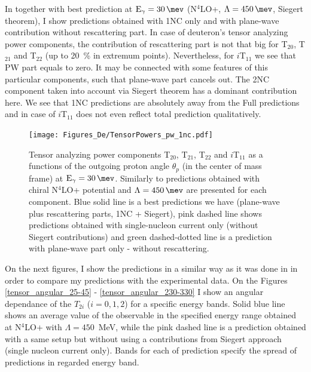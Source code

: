     In  together with best prediction at $\text{E}_\gamma = \SI{30}{\mev}$ (N$^4$LO+, $\Lambda=\SI{450}{\mev}$, Siegert theorem),
    I show predictions obtained with 1NC only and with plane-wave contribution without rescattering part.
    In case of deuteron's tensor analyzing power components, the contribution of rescattering part is not that 
    big for T$_{20}$, T$_{21}$ and T$_{22}$ (up to \SI{20}{\percent} in extremum points). Nevertheless, for
    $i$T$_{11}$ we see that PW part equals to zero. It may be connected with some features of this particular
    components, such that plane-wave part cancels out.
    The 2NC component taken into account via Siegert theorem has a dominant contribution here. We see that 
    1NC predictions are absolutely away from the Full predictions and in case of $i$T$_{11}$
    does not even reflect total prediction qualitatively.

    \begin{figure}[h]
        \begin{center}
        \texttt{[image: Figures\_De/TensorPowers\_pw\_1nc.pdf]}
        \end{center}
        \caption{Tensor analyzing power components T$_{20}$, T$_{21}$, T$_{22}$ and $i$T$_{11}$ as a functions of the
        outgoing proton angle $\theta_p$ (in the center of mass frame) at $\text{E}_\gamma = \SI{30}{\mev}$. Similarly to  predictions obtained with chiral N$^4$LO+ potential and $\Lambda=\SI{450}{\mev}$ are presented for each component.
        Blue solid line is a best predictions we have (plane-wave plus rescattering parts, 1NC + Siegert), pink dashed line shows predictions obtained with
        single-nucleon current only (without Siegert contributions) and green dashed-dotted line
        is a prediction with plane-wave part only - without rescattering.}
        \label{tensor_pw_1nc}
    \end{figure}


    
    On the next figures, I show the predictions in a similar way as it was done
    in \cite{rachek2007} in order to compare my predictions with the experimental
    data. On the Figures \ref{tensor_angular_25-45} - \ref{tensor_angular_230-330}
    I show an angular dependance of the $T_{2i}$ ($i=0,1,2$) for a specific energy bands.
    Solid blue line shows an average value of the observable in the specified energy range
    obtained at N$^4$LO+ with $\Lambda=450$~MeV, while the pink dashed line is a prediction
    obtained with a same setup but without using a contributions from Siegert approach
    (single nucleon current only). Bands for each of prediction specify the spread of
    predictions in regarded energy band.
    
